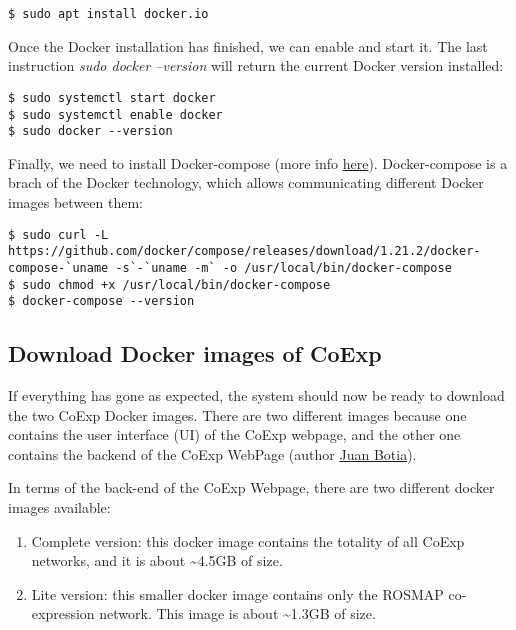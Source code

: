 \documentclass[]{book}
\providecommand{\tightlist}{%
  \setlength{\itemsep}{0pt}\setlength{\parskip}{0pt}}
\begin{document}
\begin{verbatim}
$ sudo apt install docker.io
\end{verbatim}

Once the Docker installation has finished, we can enable and start it.
The last instruction \emph{sudo docker --version} will return the
current Docker version installed:

\begin{verbatim}
$ sudo systemctl start docker
$ sudo systemctl enable docker
$ sudo docker --version
\end{verbatim}

Finally, we need to install Docker-compose (more info
\href{https://www.digitalocean.com/community/tutorials/how-to-install-docker-compose-on-ubuntu-18-04}{here}).
Docker-compose is a brach of the Docker technology, which allows
communicating different Docker images between them:

\begin{verbatim}
$ sudo curl -L https://github.com/docker/compose/releases/download/1.21.2/docker-compose-`uname -s`-`uname -m` -o /usr/local/bin/docker-compose
$ sudo chmod +x /usr/local/bin/docker-compose
$ docker-compose --version
\end{verbatim}

\subsection{Download Docker images of
CoExp}\label{download-docker-images-of-coexp}

If everything has gone as expected, the system should now be ready to
download the two CoExp Docker images. There are two different images
because one contains the user interface (UI) of the CoExp webpage, and
the other one contains the backend of the CoExp WebPage (author
\href{https://github.com/juanbot/CoExpNets}{Juan Botia}).

In terms of the back-end of the CoExp Webpage, there are two different
docker images available:

\begin{enumerate}
\def\labelenumi{\arabic{enumi}.}
\tightlist
\item
  Complete version: this docker image contains the totality of all CoExp
  networks, and it is about \textasciitilde{}4.5GB of size.
\item
  Lite version: this smaller docker image contains only the ROSMAP
  co-expression network. This image is about \textasciitilde{}1.3GB of
  size.
\end{enumerate}
\end{document}
